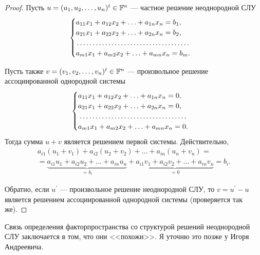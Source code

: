 \begin{proof}
    Пусть $u = (u_1, u_2, \ldots, u_n)^t \in \mathbb{F}^n$ --- частное решение неоднородной СЛУ
    \[
        \begin{cases}
            a_{11}x_1 + a_{12}x_2 + \ldots + a_{1n}x_n = b_1,\\
            a_{21}x_1 + a_{22}x_2 + \ldots + a_{2n}x_n = b_2,\\
            \dotfill\\
            a_{m1}x_1 + a_{m2}x_2 + \ldots + a_{mn}x_n = b_m.\\
        \end{cases}
    \]

    Пусть также $v = (v_1, v_2, \ldots, v_n)^t \in \mathbb{F}^n$ --- произвольное решение ассоциированной однородной системы
    \[
        \begin{cases}
            a_{11}x_1 + a_{12}x_2 + \ldots + a_{1n}x_n = 0,\\
            a_{21}x_1 + a_{22}x_2 + \ldots + a_{2n}x_n = 0,\\
            \dotfill\\
            a_{m1}x_1 + a_{m2}x_2 + \ldots + a_{mn}x_n = 0.\\
        \end{cases}
    \]
    Тогда сумма $u + v$ является решением первой системы. Действительно,
    \begin{multline*}
        a_{i1}(u_1 + v_1) + a_{i2}(u_2 + v_2) + \ldots + a_{in}(u_n + v_n) =\\ = \underbrace{a_{i1}u_1 + a_{i2}u_2 + \ldots + a_{in}u_n}_{= b_i} + \underbrace{a_{i1}v_1 + a_{i2}v_2 + \ldots + a_{in}v_n}_{= 0} = b_i.
    \end{multline*}

    Обратно, если $u^\prime$ --- произвольное решение неоднородной СЛУ, то $v = u^\prime - u$ является решением ассоциированной однородной системы (проверяется так же).
\end{proof}

Связь определения факторпространства со структурой решений неоднородной СЛУ заключается в том, что они <<похожи>>. Я уточню это позже у Игоря Андреевича.

